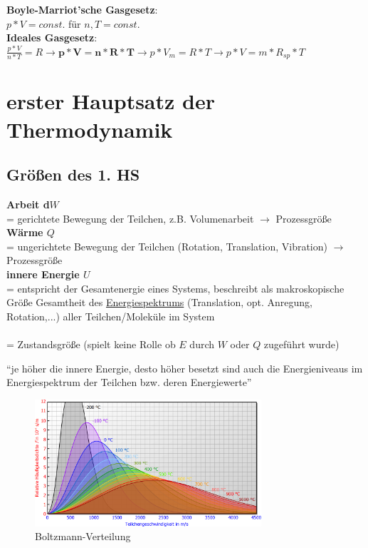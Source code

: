 \textbf{Boyle-Marriot'sche Gasgesetz}: \\
$p*V=const.$ für $n,T = const.$\\

\textbf{Ideales Gasgesetz}: \\
$\frac{p*V}{n*T}=R\rightarrow \boldsymbol{p*V=n*R*T} \rightarrow p*V_m=R*T\rightarrow p*V=m*R_{sp}*T$

\section{erster Hauptsatz der Thermodynamik}
\subsection{Größen des 1. HS}

\textbf{Arbeit d$W$}\\
= gerichtete Bewegung der Teilchen, z.B. Volumenarbeit $\rightarrow$ Prozessgröße\\

\textbf{Wärme $Q$}\\
= ungerichtete Bewegung der Teilchen (Rotation, Translation, Vibration) $\rightarrow$ Prozessgröße\\

\textbf{innere Energie $U$}\\
= entspricht der Gesamtenergie eines Systems, beschreibt als makroskopische Größe Gesamtheit des \underline{Energiespektrums} {\tiny{(Translation, opt. Anregung, Rotation,...)}} aller Teilchen/Moleküle im System \\ \\
= Zustandsgröße (spielt keine Rolle ob $E$ durch $W$ oder $Q$ zugeführt wurde)

\begin{center}
	"`je höher die innere Energie, desto höher besetzt sind auch die Energieniveaus im Energiespektrum der Teilchen bzw. deren Energiewerte"'
\end{center}

\begin{figure}[h!]
	\centering
	\includegraphics[width=0.75\textwidth]{img/boltzmann}
	\caption{Boltzmann-Verteilung}
\end{figure}
\FloatBarrier

